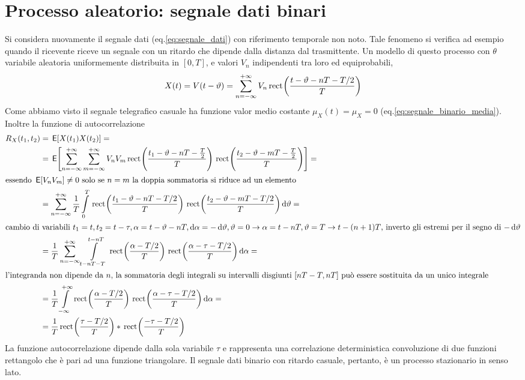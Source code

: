 \section[Processo aleatorio con riferimento temporale aleatorio]{Processo aleatorio: segnale dati binari}
Si considera nuovamente il segnale dati (eq.\ref{eq:segnale_dati}) con riferimento temporale non noto. Tale fenomeno si verifica ad esempio quando il ricevente riceve un segnale con un ritardo che dipende dalla distanza dal trasmittente. Un modello di questo processo con $\theta$ variabile aleatoria uniformemente distribuita in $[0,T]$, e valori $V_n$ indipendenti tra loro ed equiprobabili,
\[X(t)=V(t-\vartheta)=\sum_{n=-\infty}^{+\infty}V_n\,{\operatorname{rect}}^{}\!\left({\frac{t-\vartheta-n T-T/2}{T}}\right)\]
Come abbiamo visto il segnale telegrafico casuale ha funzione valor medio costante $\mu_X(t)=\mu_X=0$ (eq.\ref{eq:segnale_binario_media}).
Inoltre la funzione di autocorrelazione
\[\begin{split}R_X(t_1,t_2)&=\E{X(t_1)X(t_2)}=\\
&=\E{\sum_{n=-\infty}^{+\infty}\sum_{m=-\infty}^{+\infty}V_n V_m\rect{\frac{t_1-\theta-n T-\frac{T}{2}}{T}}\rect{\frac{t_2-\theta-m T-\frac{T}{2}}{T}}}=\\
\intertext{essendo $\E{V_nV_m}\neq 0$ solo se $n=m$ la doppia sommatoria si riduce ad un elemento}
&=\sum_{n=-\infty}^{+\infty}\frac{1}{T}\intd{0}{T}{\rect{\frac{t_1-\theta-n T-T/2}{T}}\rect{\frac{t_2-\theta-m T-T/2}{T}}}{\theta}=\\
\intertext{cambio di variabili $t_1=t, t_2=t-\tau, \alpha=t-\theta-n T,\diff\alpha=-\diff\theta, \theta=0\to\alpha=t-nT, \theta=T\to t-(n+1)T$, inverto gli estremi per il segno di $-\diff\theta$}
&=\frac{1}{T}\sum_{n=-\infty}^{+\infty}\intd{t-n T-T}{t-n T}{\rect{\frac{\alpha-T/2}{T}}\rect{\frac{\alpha-\tau-T/2}{T}}}{\alpha}=\\
\intertext{l'integranda non dipende da $n$, la sommatoria degli integrali su intervalli disgiunti $[n T-T,n T]$ può essere sostituita da un unico integrale}
&=\frac{1}{T}\intd{-\infty}{+\infty}{\rect{\frac{\alpha-T/2}{T}}\rect{\frac{\alpha-\tau-T/2}{T}}}{\alpha}=\\
&=\frac{1}{T}\rect{\frac{\tau-T/2}{T}}\ast\rect{\frac{-\tau-T/2}{T}}
\end{split}\]
La funzione autocorrelazione dipende dalla sola variabile $\tau$ e rappresenta una correlazione deterministica convoluzione di due funzioni rettangolo che è pari ad una funzione triangolare.
Il segnale dati binario con ritardo casuale, pertanto, è un processo stazionario in senso lato.

